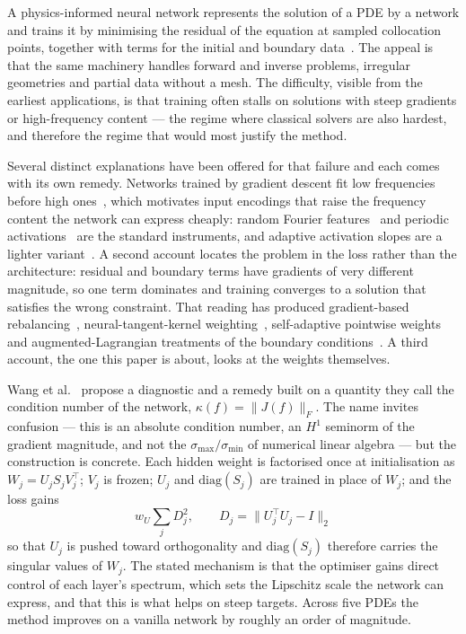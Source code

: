 \documentclass[11pt]{article}
\newcommand{\DU}{D}
\newcommand{\wU}{w_U}
\begin{document}
A physics-informed neural network represents the solution of a PDE by a network
and trains it by minimising the residual of the equation at sampled collocation
points, together with terms for the initial and boundary
data~\cite{raissi2019pinn}. The appeal is that the same machinery handles
forward and inverse problems, irregular geometries and partial data without a
mesh. The difficulty, visible from the earliest applications, is that training
often stalls on solutions with steep gradients or high-frequency content --- the
regime where classical solvers are also hardest, and therefore the regime that
would most justify the method.

Several distinct explanations have been offered for that failure and each comes
with its own remedy. Networks trained by gradient descent fit low frequencies
before high ones~\cite{rahaman2019spectral}, which motivates input encodings
that raise the frequency content the network can express cheaply: random Fourier
features~\cite{tancik2020fourier} and periodic
activations~\cite{sitzmann2020siren} are the standard instruments, and adaptive
activation slopes are a lighter variant~\cite{jagtap2020adaptive}. A second
account locates the problem in the loss rather than the architecture: residual
and boundary terms have gradients of very different magnitude, so one term
dominates and training converges to a solution that satisfies the wrong
constraint. That reading has produced gradient-based
rebalancing~\cite{wang2021gradient}, neural-tangent-kernel
weighting~\cite{wang2022ntk}, self-adaptive pointwise
weights~\cite{mcclenny2023selfadaptive} and augmented-Lagrangian treatments of
the boundary conditions~\cite{son2023alpinn}. A third account, the one this
paper is about, looks at the weights themselves.

Wang et al.~\cite{wang2026cnpinn} propose a diagnostic and a remedy built on a
quantity they call the condition number of the network,
$\kappa(f) = \|J(f)\|_F$. The name invites confusion --- this is an absolute
condition number, an $H^1$ seminorm of the gradient magnitude, and not the
$\sigma_{\max}/\sigma_{\min}$ of numerical linear algebra --- but the
construction is concrete. Each hidden weight is factorised once at
initialisation as $W_j = U_j S_j V_j^\top$; $V_j$ is frozen; $U_j$ and
$\mathrm{diag}(S_j)$ are trained in place of $W_j$; and the loss gains
\begin{equation}
  \wU \sum_j \DU_j^2, \qquad \DU_j = \|U_j^\top U_j - I\|_2
  \label{eq:penalty}
\end{equation}
so that $U_j$ is pushed toward orthogonality and $\mathrm{diag}(S_j)$ therefore
carries the singular values of $W_j$. The stated mechanism is that the optimiser
gains direct control of each layer's spectrum, which sets the Lipschitz scale
the network can express, and that this is what helps on steep targets. Across
five PDEs the method improves on a vanilla network by roughly an order of
magnitude.
\end{document}
